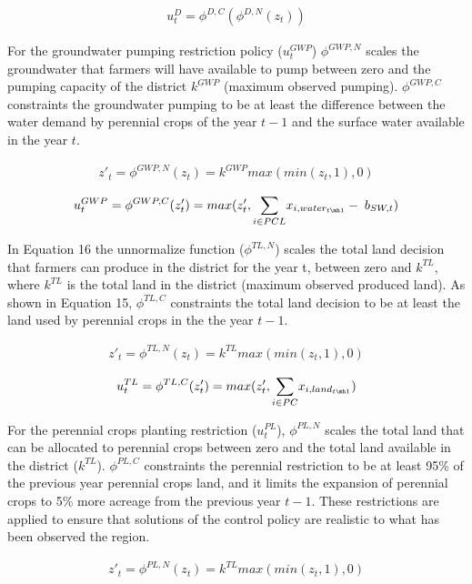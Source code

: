 \documentclass[a4paper,fleqn]{cas-sc}
\begin{document}
\begin{align}
u^{D}_t = \phi^{D,C}(\phi^{D,N}(z_{t}))
\end{align}

For the groundwater pumping restriction policy ($u^{GWP}_t$) $\phi^{GWP,N}$ scales the groundwater that farmers will have available to pump between zero and the pumping capacity of the district $k^{GWP}$ (maximum observed pumping). $\phi^{GWP,C}$ constraints the groundwater pumping to be at least the difference between the water demand by perennial crops of the year $t-1$ and the surface water available in the year $t$. 

\begin{align}
z'_{t}=\phi^{GWP,N}(z_{t}) = k^{GWP}max(min(z_{t},1),0) 
\end{align}

\begin{align}
u^{GWP}_t = \phi^{GWP,C}(z'_{t})= max(z'_{t},\underset{i \in PCL}{\sum} x_{i,water_{t\mh1}} - \; b_{SW,t})
\end{align}

In Equation 16 the unnormalize function ($\phi^{TL,N}$) scales the total land decision that farmers can produce in the district for the year t, between zero and $k^{TL}$, where $k^{TL}$ is the total land in the district (maximum observed produced land). As shown in Equation 15, $\phi^{TL,C}$ constraints the total land decision to be at least the land used by perennial crops in the the year $t-1$.

\begin{align}
z'_{t} = \phi^{TL,N}(z_{t}) = k^{TL}max(min(z_{t},1),0)
\end{align}

\begin{align}
u^{TL}_t = \phi^{TL,C}(z'_{t})= max(z'_{t},\underset{i \in PC}{\sum} x_{i,land_{t\mh1}})
\end{align}

For the perennial crops planting restriction ($u^{PL}_t$), $\phi^{PL,N}$ scales the total land that can be allocated to perennial crops between zero and the total land available in the district ($k^{TL}$). $\phi^{PL,C}$ constraints the perennial restriction to be at least 95\% of the previous year perennial crops land, and it limits the expansion of perennial crops to 5\% more acreage from the previous year $t-1$. These restrictions are applied to ensure that solutions of the control policy are realistic to what has been observed the region.

\begin{align}
z'_{t} = \phi^{PL,N}(z_{t}) = k^{TL}max(min(z_{t},1),0)
\end{align}
\end{document}
